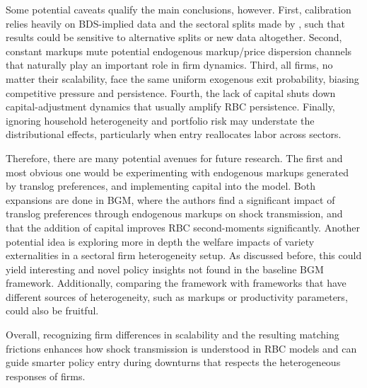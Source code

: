 \documentclass[a4paper,12pt]{article} %
\numberwithin{equation}{section} %
\numberwithin{figure}{section}
\numberwithin{table}{section}
\begin{document}
Some potential caveats qualify the main conclusions, however. First, calibration relies heavily on BDS-implied data and the sectoral splits made by 
\textcite{sedlavcek2017growth}, such that results could be sensitive to alternative splits or new data altogether. Second, constant markups mute 
potential endogenous markup/price dispersion channels that naturally play an important role in firm dynamics. Third, all firms, no matter their scalability,
face the same uniform exogenous exit probability, biasing competitive pressure and persistence. Fourth, the lack of capital shuts down capital-adjustment
dynamics that usually amplify RBC persistence. Finally, ignoring household heterogeneity and portfolio risk may understate the distributional
effects, particularly when entry reallocates labor across sectors.

Therefore, there are many potential avenues for future research. The first and most obvious one would be experimenting with endogenous markups generated by
translog preferences, and implementing capital into the model. Both expansions are done in BGM, where the authors find a significant
impact of translog preferences through endogenous markups on shock transmission, and that the addition of capital improves RBC second-moments significantly.
Another potential idea is exploring more in depth the welfare impacts of variety externalities in a sectoral firm heterogeneity setup. As discussed before, 
this could yield interesting and novel policy insights not found in the baseline BGM framework. Additionally, comparing the framework with frameworks 
that have different sources of heterogeneity, such as markups or productivity parameters, could also be fruitful. 

Overall, recognizing firm differences in scalability and the resulting matching frictions enhances how 
shock transmission is understood in RBC models and can guide smarter policy entry during downturns that respects
the heterogeneous responses of firms. 



\newpage
\thispagestyle{plain}
\printbibliography[heading=bibintoc] %
\end{document}
